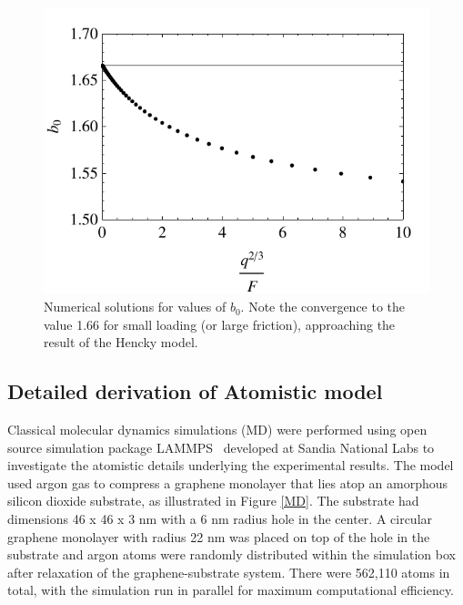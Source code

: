 \begin{figure}
\begin{center}
\begin{center}
\includegraphics{Figs_Friction/b0.pdf}
\end{center}
\end{center}
\caption{\label{b0} Numerical solutions for values of $b_0$. Note the convergence to the value 1.66 for small loading (or large friction), approaching the result of the Hencky model.}
\end{figure}

\subsection{Detailed derivation of Atomistic model}
Classical molecular dynamics simulations (MD) were performed using open source simulation package LAMMPS~\cite{plimptonLAMMPS,PlimptonJCP1995} developed at Sandia National Labs to investigate the atomistic details underlying the experimental results. The model used argon gas to compress a graphene monolayer that lies atop an amorphous silicon dioxide substrate, as illustrated in Figure \ref{MD}.  The substrate had dimensions 46 x 46 x 3 nm with a 6 nm radius hole in the center.  A circular graphene monolayer with radius 22 nm was placed on top of the hole in the substrate and argon atoms were randomly distributed within the simulation box after relaxation of the graphene-substrate system.   There were 562,110 atoms in total, with the simulation run in parallel for maximum computational efficiency.

